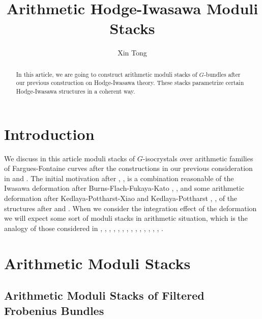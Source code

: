 \documentclass[12pt]{article}
\title{Arithmetic Hodge-Iwasawa Moduli Stacks}
\author{Xin Tong}
\date{}
\begin{document}
\maketitle

\begin{abstract}
\noindent In this article, we are going to construct arithmetic moduli stacks of $G$-bundles after our previous construction on Hodge-Iwasawa theory. These stacks parametrize certain Hodge-Iwasawa structures in a coherent way.
\end{abstract}




\tableofcontents





\newpage
\section{Introduction}

We discuss in this article moduli stacks of $G$-isocrystals over arithmetic families of Fargues-Fontaine curves after the constructions in our previous consideration in \cite{T1} and \cite{T2}. The initial motivation after \cite{Iwa}, \cite{T}, \cite{F} is a combination reasonable of the Iwasawa deformation after Burns-Flach-Fukaya-Kato \cite{BF1}, \cite{BF2}, \cite{FK} and some arithmetic deformation after Kedlaya-Pottharst-Xiao and Kedlaya-Pottharst \cite{KPX}, \cite{KP}, of the structures after \cite{KL1} and \cite{KL2}. When we consider the integration effect of the deformation we will expect some sort of moduli stacks in arithmetic situation, which is the analogy of those considered in \cite{He1}, \cite{PR}, \cite{Dr}, \cite{SW}, \cite{Ked}, \cite{RZ}, \cite{G}, \cite{Dr1}, \cite{Dr2}, \cite{Har}, \cite{Har1},  \cite{HV}, \cite{M}, \cite{FS}, \cite{Sch1}.








\section{Arithmetic Moduli Stacks}


 

\subsection{Arithmetic Moduli Stacks of Filtered Frobenius Bundles}
\end{document}
